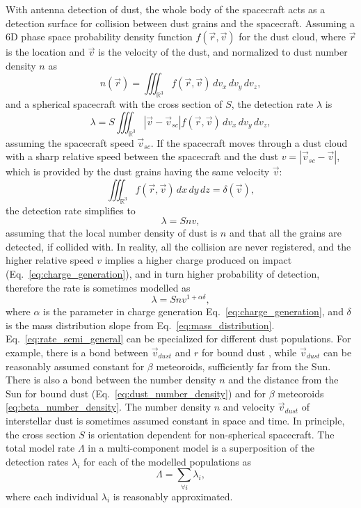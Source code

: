 With antenna detection of dust, the whole body of the spacecraft acts as a detection surface for collision between dust grains and the spacecraft. Assuming a 6D phase space probability density function $f(\vec{r},\vec{v})$ for the dust cloud, where $\vec{r}$ is the location and $\vec{v}$ is the velocity of the dust, and normalized to dust number density $n$ as
\begin{equation}
    n(\vec{r}) = \iiint_{\mathbb{R}^3} f(\vec{r},\vec{v}) \,dv_x\,dv_y\,dv_z,
\end{equation}
and a spherical spacecraft with the cross section of $S$, the detection rate $\lambda$ is
\begin{equation}
    \lambda = S \iiint_{\mathbb{R}^3} |\vec{v}-\vec{v}_{sc}| f(\vec{r},\vec{v})  \,dv_x\,dv_y\,dv_z, \label{eq:phase_space_lambda}
\end{equation}
assuming the spacecraft speed $\vec{v}_{sc}$. If the spacecraft moves through a dust cloud with a sharp relative speed between the spacecraft and the dust $v=|\vec{v}_{sc}-\vec{v}|$, which is provided by the dust grains having the same velocity $\vec{v}$:
\begin{equation}
    \iiint_{\mathbb{R}^3} f(\vec{r},\vec{v}) \,dx\,dy\,dz = \delta(\vec{v}),
\end{equation}
the detection rate simplifies to  
\begin{equation}
    \lambda = S n v,
\end{equation}
assuming that the local number density of dust is $n$ and that all the grains are detected, if collided with. In reality, all the collision are never registered, and the higher relative speed $v$ implies a higher charge produced on impact (Eq.~\ref{eq:charge_generation}), and in turn higher probability of detection, therefore the rate is sometimes modelled as
\begin{equation}
    \lambda = S n v^{1+\alpha \delta}, \label{eq:rate_semi_general}
\end{equation}
where $\alpha$ is the parameter in charge generation Eq.~\ref{eq:charge_generation}, and $\delta$ is the mass distribution slope from Eq.~\ref{eq:mass_distribution}. Eq.~\ref{eq:rate_semi_general} can be specialized for different dust populations. For example, there is a bond between $\vec{v}_{dust}$ and $r$ for bound dust \citep{szalay2020near}, while $\vec{v}_{dust}$ can be reasonably assumed constant \citep{zaslavsky2021first} for $\beta$ meteoroids, sufficiently far from the Sun. There is also a bond between the number density $n$ and the distance from the Sun for bound dust (Eq.~\ref{eq:dust_number_density}) and for $\beta$ meteoroids \ref{eq:beta_number_density}. The number density $n$ and velocity $\vec{v}_{dust}$ of interstellar dust is sometimes assumed constant in space and time. In principle, the cross section $S$ is orientation dependent for non-spherical spacecraft. The total model rate $\Lambda$ in a multi-component model is a superposition of the detection rates $\lambda_i$ for each of the modelled populations as
\begin{equation}
    \Lambda = \sum_{\forall i} \lambda_i,
\end{equation}
where each individual $\lambda_i$ is reasonably approximated. 

